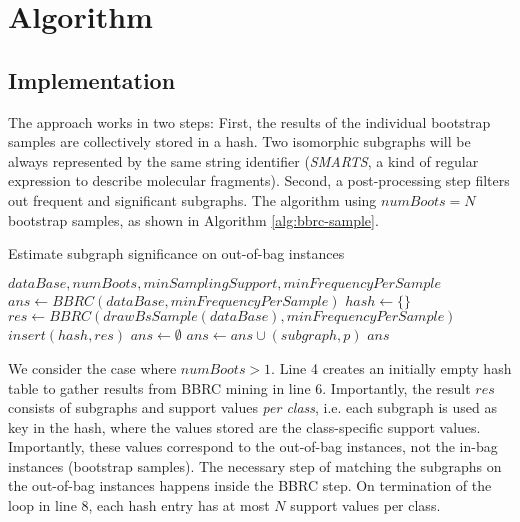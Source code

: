 \documentclass{article}
\begin{document}
\section{Algorithm}
\label{s:Algorithm}

\subsection{Implementation}
The approach works in two steps: First, the results of the individual
bootstrap samples are collectively stored in a hash. Two isomorphic subgraphs
will be always represented by the same string identifier (\emph{SMARTS}, a kind
of regular expression to describe molecular fragments). Second, a
post-processing step filters out frequent and significant subgraphs. The
algorithm using $numBoots=N$ bootstrap samples, as shown in Algorithm
\ref{alg:bbrc-sample}.

\renewcommand{\algorithmicrequire}{\textbf{Input:}}
\renewcommand{\algorithmicensure}{\textbf{Output:}}
\begin{algorithm}
  \caption{Estimate subgraph significance on out-of-bag instances}
  \label{alg:bbrc-sample}
\begin{algorithmic}[1]
  \Require $dataBase, numBoots, minSamplingSupport, minFrequencyPerSample$
    \State $ans \gets BBRC(dataBase, minFrequencyPerSample)$
  \Else
    \State $hash \gets \{\}$
     
        \State $res \gets BBRC(drawBsSample(dataBase), minFrequencyPerSample)$
      \State $insert(hash,res)$
    \EndFor
    \State $ans \gets \emptyset$
          \State $ans\gets ans \cup (subgraph,p)$
        \EndIf
      \EndIf
    \EndFor
  \EndIf
  \Ensure $ans$
\end{algorithmic}
\end{algorithm}

We consider the case where $numBoots>1$. Line 4 creates an initially empty hash
table to gather results from BBRC mining in line 6. Importantly, the result
$res$ consists of subgraphs and support values \emph{per class}, i.e. each
subgraph is used as key in the hash, where the values stored are the
class-specific support values. Importantly, these values correspond to the
out-of-bag instances, not the in-bag instances (bootstrap samples). The
necessary step of matching the subgraphs on the out-of-bag instances happens
inside the BBRC step. On termination of the loop in line 8, each hash entry has
at most $N$ support values per class.
\end{document}

